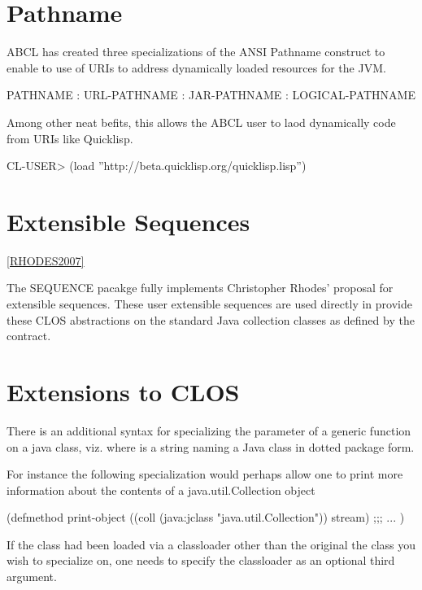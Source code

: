 \documentclass[10pt]{book}
\begin{document}
\section{Pathname}

ABCL has created three specializations of the ANSI Pathname construct
to enable to use of URIs to address dynamically loaded resources for
the JVM.

PATHNAME : URL-PATHNAME : JAR-PATHNAME
   : LOGICAL-PATHNAME

Among other neat befits, this allows the ABCL user to laod dynamically
code from URIs like Quicklisp.

\begin{listing-lisp}
  CL-USER> (load ''http://beta.quicklisp.org/quicklisp.lisp'')
\end{listing-lisp}


         
\section{Extensible Sequences}

\ref{RHODES2007}

The SEQUENCE pacakge fully implements Christopher Rhodes' proposal for
extensible sequences.  These user extensible sequences are used
directly in  provide these CLOS
abstractions on the standard Java collection classes as defined by the
 contract.


\section{Extensions to CLOS}

There is an additional syntax for specializing the parameter of a
generic function on a java class, viz. 
where  is a string naming a Java class in dotted package
form.

For instance the following specialization would perhaps allow one to
print more information about the contents of a java.util.Collection
object

\begin{listing-lisp}
(defmethod print-object ((coll (java:jclass "java.util.Collection"))
                         stream)
  ;;; ...
)
\end{listing-lisp}

If the class had been loaded via a classloader other than the original
the class you wish to specialize on, one needs to specify the
classloader as an optional third argument.
\end{document}

